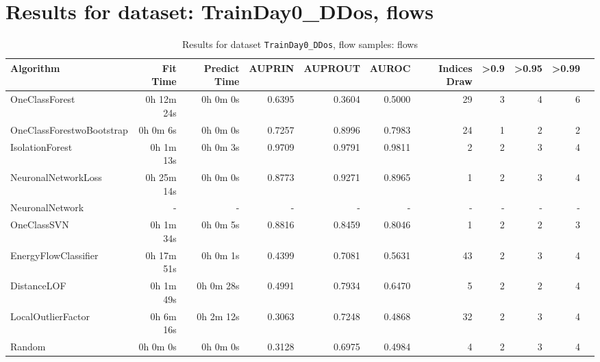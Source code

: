 \documentclass{article}
\begin{document}
\section*{Results for dataset: TrainDay0_DDos, flows}
\begin{table}[h!]
\centering
\caption{Results for dataset \texttt{TrainDay0_DDos}, flow samples: flows}
\label{tab:trainday0ddos_flows}
\begin{tabular}{lrrrrrrrrrr}
\toprule
Algorithm & Fit Time & Predict Time & AUPRIN & AUPROUT & AUROC & Indices Draw & >0.9 & >0.95 & >0.99 \\
\midrule
OneClassForest & 0h 12m 24s & 0h 0m 0s & 0.6395 & 0.3604 & 0.5000 & 29 & 3 & 4 & 6 \\
OneClassForestwoBootstrap & 0h 0m 6s & 0h 0m 0s & 0.7257 & 0.8996 & 0.7983 & 24 & 1 & 2 & 2 \\
IsolationForest & 0h 1m 13s & 0h 0m 3s & 0.9709 & 0.9791 & 0.9811 & 2 & 2 & 3 & 4 \\
NeuronalNetworkLoss & 0h 25m 14s & 0h 0m 0s & 0.8773 & 0.9271 & 0.8965 & 1 & 2 & 3 & 4 \\
NeuronalNetwork & - & - & - & - & - & - & - & - & - \\
OneClassSVN & 0h 1m 34s & 0h 0m 5s & 0.8816 & 0.8459 & 0.8046 & 1 & 2 & 2 & 3 \\
EnergyFlowClassifier & 0h 17m 51s & 0h 0m 1s & 0.4399 & 0.7081 & 0.5631 & 43 & 2 & 3 & 4 \\
DistanceLOF & 0h 1m 49s & 0h 0m 28s & 0.4991 & 0.7934 & 0.6470 & 5 & 2 & 2 & 4 \\
LocalOutlierFactor & 0h 6m 16s & 0h 2m 12s & 0.3063 & 0.7248 & 0.4868 & 32 & 2 & 3 & 4 \\
Random & 0h 0m 0s & 0h 0m 0s & 0.3128 & 0.6975 & 0.4984 & 4 & 2 & 3 & 4 \\
\bottomrule
\end{tabular}
\end{table}
\end{document}
